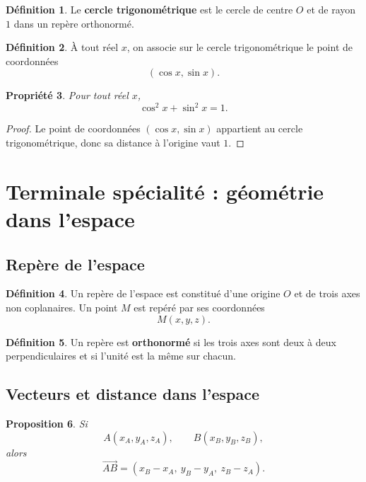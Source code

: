 \documentclass[11pt,a4paper]{article}
\theoremstyle{definition}
\newtheorem{definition}{Définition}[section]
\theoremstyle{plain}
\newtheorem{propriete}[definition]{Propriété}
\newtheorem{proposition}[definition]{Proposition}
\begin{document}
\begin{definition}
Le \textbf{cercle trigonométrique} est le cercle de centre $O$ et de rayon $1$ dans un repère orthonormé.
\end{definition}

\begin{definition}
À tout réel $x$, on associe sur le cercle trigonométrique le point de coordonnées
\[
(\cos x,\sin x).
\]
\end{definition}

\begin{propriete}
Pour tout réel $x$,
\[
\cos^2 x+\sin^2 x=1.
\]
\end{propriete}

\begin{proof}
Le point de coordonnées $(\cos x,\sin x)$ appartient au cercle trigonométrique, donc sa distance à l'origine vaut $1$.
\end{proof}

\newpage

\section{Terminale spécialité : géométrie dans l'espace}

\subsection{Repère de l'espace}

\begin{definition}
Un repère de l'espace est constitué d'une origine $O$ et de trois axes non coplanaires.
Un point $M$ est repéré par ses coordonnées
\[
M(x,y,z).
\]
\end{definition}

\begin{definition}
Un repère est \textbf{orthonormé} si les trois axes sont deux à deux perpendiculaires et si l'unité est la même sur chacun.
\end{definition}

\subsection{Vecteurs et distance dans l'espace}

\begin{proposition}
Si
\[
A(x_A,y_A,z_A),\qquad B(x_B,y_B,z_B),
\]
alors
\[
\overrightarrow{AB}=(x_B-x_A,\ y_B-y_A,\ z_B-z_A).
\]
\end{proposition}
\end{document}
